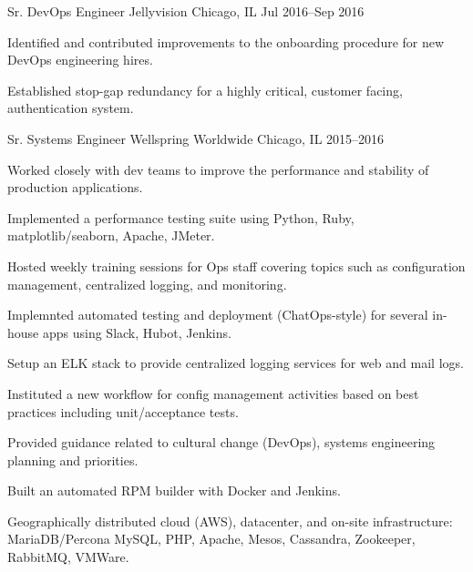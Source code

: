 \begin{cventries}
  \cventry
    {Sr. DevOps Engineer} %
    {Jellyvision} %
    {Chicago, IL} %
    {Jul 2016--Sep 2016} %
    {
      \begin{cvitems} %
        \item {Identified and contributed improvements to the onboarding procedure for new DevOps engineering hires.}
        \item {Established stop-gap redundancy for a highly critical, customer facing, authentication system.}
      \end{cvitems}
    }
    {}

  \cventry
    {Sr. Systems Engineer} %
    {Wellspring Worldwide} %
    {Chicago, IL} %
    {2015--2016} %
    {
      \begin{cvitems} %
        \item {Worked closely with dev teams to improve the performance and stability of production applications.}
        \item {Implemented a performance testing suite using Python, Ruby, matplotlib/seaborn, Apache, JMeter.}
        \item {Hosted weekly training sessions for Ops staff covering topics such as configuration management, centralized logging, and monitoring.}
        \item {Implemnted automated testing and deployment (ChatOps-style) for several in-house apps using Slack, Hubot, Jenkins.}
        \item {Setup an ELK stack to provide centralized logging services for web and mail logs.}
        \item {Instituted a new workflow for config management activities based on best practices including unit/acceptance tests.}
        \item {Provided guidance related to cultural change (DevOps), systems engineering planning and priorities.}
        \item {Built an automated RPM builder with Docker and Jenkins.}
      \end{cvitems}
    }
    {
      \begin{cventrysummary}
        Geographically distributed cloud (AWS), datacenter, and on-site infrastructure: \\ MariaDB/Percona MySQL, PHP, Apache, Mesos, Cassandra, Zookeeper, RabbitMQ, VMWare.
      \end{cventrysummary}
    }



\end{cventries}
